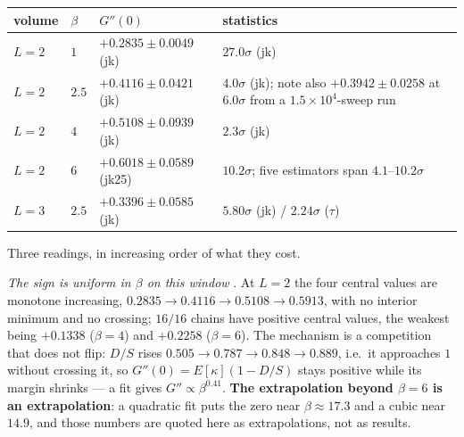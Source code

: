 \begin{center}
\footnotesize
\begin{tabular}{@{}lll>{\raggedright\arraybackslash}p{6.4cm}@{}}
\toprule
volume & $\beta$ & $G''(0)$ & statistics\\
\midrule
$L=2$ & $1$   & $+0.2835\pm0.0049$ (jk) & $27.0\sigma$ (jk)\\
$L=2$ & $2.5$ & $+0.4116\pm0.0421$ (jk) & $4.0\sigma$ (jk); note also $+0.3942\pm0.0258$ at $6.0\sigma$
from a $1.5\times10^{4}$-sweep run\\
$L=2$ & $4$   & $+0.5108\pm0.0939$ (jk) & $2.3\sigma$ (jk)\\
$L=2$ & $6$   & $+0.6018\pm0.0589$ (jk25) & $10.2\sigma$; five estimators span $4.1$--$10.2\sigma$\\
$L=3$ & $2.5$ & $+0.3396\pm0.0585$ (jk) & $5.80\sigma$ (jk) / $2.24\sigma$ ($\tau$)\\
\bottomrule
\end{tabular}
\end{center}

Three readings, in increasing order of what they cost.

\emph{The sign is uniform in $\beta$ on this window} \LE. At $L=2$ the four central values are
monotone increasing, $0.2835\to0.4116\to0.5108\to0.5913$, with no interior minimum and no crossing;
$16/16$ chains have positive central values, the weakest being $+0.1338$ ($\beta=4$) and $+0.2258$
($\beta=6$). The mechanism is a competition that does not flip: $D/S$ rises $0.505\to0.787\to0.848\to
0.889$, i.e.\ it approaches $1$ without crossing it, so $G''(0)=E[\kappa](1-D/S)$ stays positive while
its margin shrinks --- a fit gives $G''\propto\beta^{0.41}$. \textbf{The extrapolation beyond
$\beta=6$ is an extrapolation}: a quadratic fit puts the zero near $\beta\approx17.3$ and a cubic near
$14.9$, and those numbers are quoted here as extrapolations, not as results.

